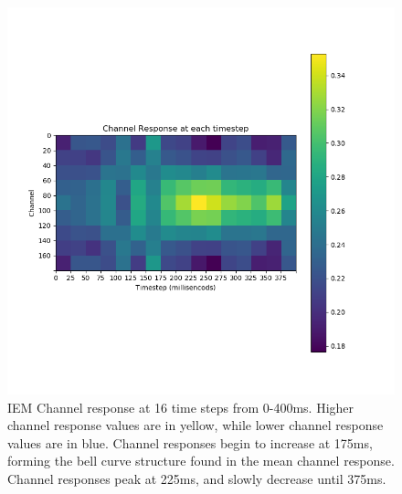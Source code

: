 \documentclass[../main.tex]{subfiles}
\begin{document}
\begin{figure}
    \centering
    \includegraphics[scale=0.7]{figures/results/timestep_ch_response.png}
    \caption{IEM Channel response at 16 time steps from 0-400ms. Higher channel response values are in yellow, while lower channel response values are in blue. Channel responses begin to increase at 175ms, forming the bell curve structure found in the mean channel response. Channel responses peak at 225ms, and slowly decrease until 375ms.}
    \label{timestep_ch_response}
\end{figure}
\end{document}
